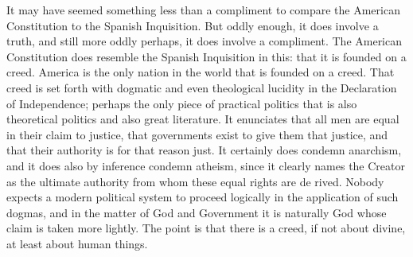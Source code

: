 \documentclass{book}
\begin{document}
It may have seemed something less than a compliment to compare the American Constitution to the Spanish Inquisition. But oddly enough, it does involve a truth, and still more oddly perhaps, it does involve a compliment. The American Constitution does resemble the Spanish Inquisition in this: that it is founded on a creed. America is the only nation in the world that is founded on a creed. That creed is set forth with dogmatic and even theological lucidity in the Declaration of Independence; perhaps the only piece of practical politics that is also theoretical politics and also great literature. It enunciates that all men are equal in their claim to justice, that governments exist to give them that justice, and that their authority is for that reason just. It certainly does condemn anarchism, and it does also by inference condemn atheism, since it clearly names the Creator as the ultimate authority from whom these equal rights are de rived. Nobody expects a modern political system to proceed logically in the application of such dogmas, and in the matter of God and Government it is naturally God whose claim is taken more lightly. The point is that there is a creed, if not about divine, at least about human things.
\end{document}
